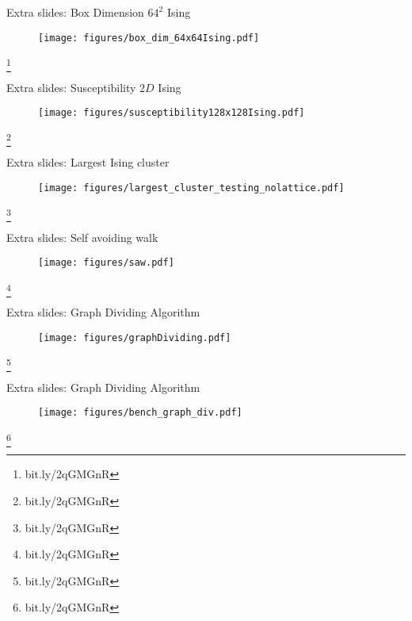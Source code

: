 \documentclass[10pt]{beamer}
\newcommand\blfootnote[1]{%
  \begingroup
  \renewcommand\thefootnote{}\footnote{#1}%
  \addtocounter{footnote}{-1}%
  \endgroup
}
\begin{document}
\appendix

\begin{frame}[fragile]{Extra slides: Box Dimension $64^2$ Ising}
    \begin{figure}[h!]
        \centering
            \texttt{[image: figures/box\_dim\_64x64Ising.pdf]}
    \end{figure}
    \blfootnote{bit.ly/2qGMGnR}
\end{frame}

\begin{frame}[fragile]{Extra slides: Susceptibility $2D$ Ising}
    \begin{figure}[h!]
        \centering
            \texttt{[image: figures/susceptibility128x128Ising.pdf]}
    \end{figure}
    \blfootnote{bit.ly/2qGMGnR}
\end{frame}

\begin{frame}[fragile]{Extra slides: Largest Ising cluster}
    \begin{figure}[h!]
        \centering
            \texttt{[image: figures/largest\_cluster\_testing\_nolattice.pdf]}
    \end{figure}
    \blfootnote{bit.ly/2qGMGnR}
\end{frame}

\begin{frame}[fragile]{Extra slides: Self avoiding walk}
    \begin{figure}[h!]
        \centering
            \texttt{[image: figures/saw.pdf]}
    \end{figure}
    \blfootnote{bit.ly/2qGMGnR}
\end{frame}


\begin{frame}[fragile]{Extra slides: Graph Dividing Algorithm}
    \begin{figure}[h!]
        \centering
            \texttt{[image: figures/graphDividing.pdf]}
    \end{figure}
    \blfootnote{bit.ly/2qGMGnR}
\end{frame}

\begin{frame}[fragile]{Extra slides: Graph Dividing Algorithm}
    \begin{figure}[h!]
        \centering
            \texttt{[image: figures/bench\_graph\_div.pdf]}
    \end{figure}
    \blfootnote{bit.ly/2qGMGnR}
\end{frame}
\end{document}
